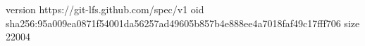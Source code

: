 version https://git-lfs.github.com/spec/v1
oid sha256:95a009ea0871f54001da56257ad49605b857b4e888ee4a7018faf49c17fff706
size 22004
